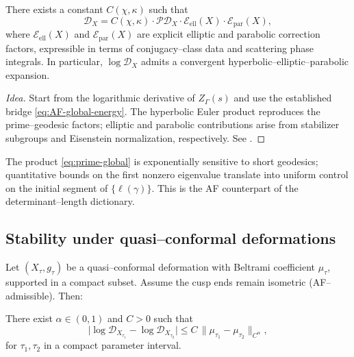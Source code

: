 \begin{theorem}
\label{thm:prime-product}
There exists a constant $C(\chi,\kappa)$ such that
\begin{equation}\label{eq:prime-global}
\mathscr{D}_X
= C(\chi,\kappa)\cdot \mathcal{P}\mathscr{D}_X\cdot \mathcal{E}_{\mathrm{ell}}(X)\cdot \mathcal{E}_{\mathrm{par}}(X),
\end{equation}
where $\mathcal{E}_{\mathrm{ell}}(X)$ and $\mathcal{E}_{\mathrm{par}}(X)$ are explicit elliptic and parabolic correction factors, expressible in terms of conjugacy–class data and scattering phase integrals. In particular, $\log\mathscr{D}_X$ admits a convergent hyperbolic–elliptic–parabolic expansion.
\end{theorem}

\begin{proof}[Idea]
Start from the logarithmic derivative of $Z_\Gamma(s)$ and use the established bridge \eqref{eq:AF-global-energy}. The hyperbolic Euler product reproduces the prime–geodesic factors; elliptic and parabolic contributions arise from stabilizer subgroups and Eisenstein normalization, respectively. See \cite{HejhalII,Sarnak1983,Borthwick}. %
\end{proof}

\begin{remark}
The product \eqref{eq:prime-global} is exponentially sensitive to short geodesics; quantitative bounds on the first nonzero eigenvalue translate into uniform control on the initial segment of $\{\ell(\gamma)\}$. This is the AF counterpart of the determinant–length dictionary. %
\end{remark}

\subsection{Stability under quasi–conformal deformations}
\label{subsec:stability}
\relax\hspace{0pt}

Let $(X_\tau,g_\tau)$ be a quasi–conformal deformation with Beltrami coefficient $\mu_\tau$, supported in a compact subset. Assume the cusp ends remain isometric (AF–admissible). Then:

\begin{proposition}
\label{prop:holder}
There exist $\alpha\in(0,1)$ and $C>0$ such that
\[
\big|\log\mathscr{D}_{X_{\tau_1}}-\log\mathscr{D}_{X_{\tau_2}}\big|
\le C\, \|\mu_{\tau_1}-\mu_{\tau_2}\|_{C^\alpha},
\]
for $\tau_1,\tau_2$ in a compact parameter interval.
\end{proposition}

